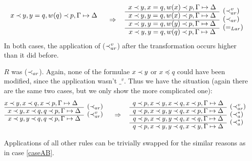 \begin{PROOF}
\begin{LS}
\begin{LSA}
\begin{LSB}
\[\begin{array}{cl}
x\Incl y, y=q, w(q)\Incl p,\GSD \\  \ 
\end{array}
\conv
 \begin{array}{cl}
x\Incl y, x=q, w(x)\Incl p,\GSD  & \raisebox{-1.2ex}[1.5ex][0ex]{($\Incl_{ar}^v$)} \\ \cline{1-1}
x\Incl y, y=q, w(x)\Incl p, \GSD &
\raisebox{-1.2ex}[1.5ex][0ex]{($\Incl_{ar}$)} \\ \cline{1-1}
x\Incl y, y=q, w(y)\Incl p, \GSD &
\raisebox{-1.2ex}[1.5ex][0ex]{($=_{Lar}$)} \\ \cline{1-1}
x\Incl y, y=q, w(q)\Incl p, \GSD &
\end{array}
\]
In both cases, the application of ($\mathbin{\prec}_{ar}^v$) after the transformation occurs higher 
than it did before.
\end{LSB}
\item $R$ was ($\mathbin{\prec}_{ar}$). Again, none of the formulae $x\mathbin{\prec} y$ or $x\preceq q$ could 
have been modified, since the application wasn't $\_^v$. Thus we have the situation (again
there are the same two cases, but we only show the more complicated one):
\[ \begin{array}{cl} \hspace*{-1em}
x\Incl y, x\Incl q, x\Incl p,\GSD    & \raisebox{-1.2ex}[1.5ex][0ex]{($\Incl_{ar}$)} \\ \cline{1-1}
x\Incl y, x\Incl q, q\Incl p, \GSD &
\raisebox{-1.2ex}[1.5ex][0ex]{($\Incl_{ar}^v$)} \\ \cline{1-1}
x\Incl y, y\Incl q, q\Incl p,\GSD \\  \ 
\end{array}
\conv
\begin{array}{cl}
q\Incl p, x\Incl y, x\Incl q, x\Incl p,\GSD    & \raisebox{-1.2ex}[1.5ex][0ex]{($\Incl_{ar}^v$)} \\ \cline{1-1}
q\Incl p, x\Incl y, y\Incl q, x\Incl p, \GSD &
\raisebox{-1.2ex}[1.5ex][0ex]{($\Incl_{a}^*$)} \\ \cline{1-1}
q\Incl p, x\Incl y, y\Incl q, x\Incl q, \GSD &
\raisebox{-1.2ex}[1.5ex][0ex]{($\Incl_{a}^*$)} \\ \cline{1-1}
q\Incl p, x\Incl y, y\Incl q, x\Incl y, \GSD &
\end{array}
\]
\item Applications of all other rules can be trivially swapped for the similar reasons as in 
case \ref{caseAB}.
\end{LSA}
\end{LS}
\end{PROOF}
%

